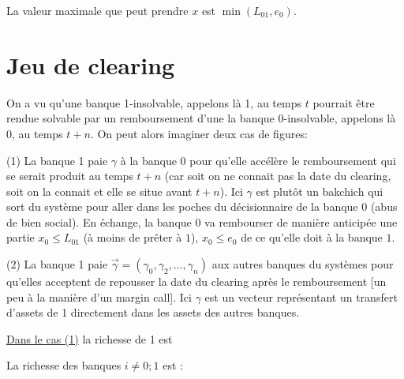 \documentclass[11pt,oneside,twocolumn]{article}
\begin{document}
La valeur maximale que peut prendre $x$ 
est $\min(L_{01},e_0)$.

\section{Jeu de clearing}
On a vu qu'une banque 1-insolvable, appelons là 1, au temps $t$ pourrait être rendue solvable par un remboursement d'une la banque 0-insolvable, appelons là 0, au temps $t+n$. On peut alors imaginer deux cas de figures:

(1) La banque 1 paie $\gamma$ à la banque 0 pour qu'elle accélère le remboursement qui se serait produit au temps $t+n$ (car soit on ne connait pas la date du clearing, soit on la connait et elle se situe avant $t+n$). Ici $\gamma$ est plutôt un bakchich qui sort du système pour aller dans les poches du décisionnaire de la banque $0$ (abus de bien social). En échange, la banque $0$ va rembourser de manière anticipée une partie $x_0\leq L_{01}$ (à moins de prêter à $1$), 
$x_0\leq e_0$ de ce qu'elle doit à la banque $1$.


(2) La banque 1 paie $\vec \gamma = (\gamma_0, \gamma_2, \ldots, \gamma_n)$ aux autres banques du systèmes pour qu'elles acceptent de repousser la date du clearing après le remboursement [un peu à la manière d'un margin call]. Ici $\gamma$ est un vecteur représentant un transfert d'assets de 1 directement dans les assets des autres banques.



\underline{Dans le cas (1)} la richesse de 1 est


La richesse des banques $i\neq 0; 1$ est : 

\end{document}
